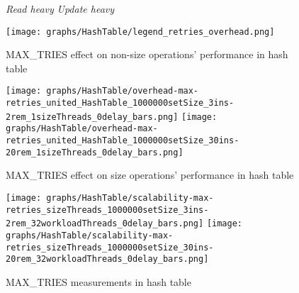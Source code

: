 \documentclass{article}
\begin{document}
\begin{figure*}[htbp]
	\centering
	\medskip
	\textit{Read heavy}\hspace{10cm}
	\textit{Update heavy}\par
	\medskip
	\texttt{[image: graphs/HashTable/legend\_retries\_overhead.png]}\par\vspace{0.5em}
    MAX\_TRIES effect on non-size operations' performance in hash table\par
        \medskip
	\texttt{[image: graphs/HashTable/overhead-max-retries\_united\_HashTable\_1000000setSize\_3ins-2rem\_1sizeThreads\_0delay\_bars.png]}\hspace{2.5em}
	\texttt{[image: graphs/HashTable/overhead-max-retries\_united\_HashTable\_1000000setSize\_30ins-20rem\_1sizeThreads\_0delay\_bars.png]}\vspace{-1.2em}

    	        \vspace{1.2em}
	MAX\_TRIES effect on size operations' performance in hash table\par
        \medskip
	\texttt{[image: graphs/HashTable/scalability-max-retries\_sizeThreads\_1000000setSize\_3ins-2rem\_32workloadThreads\_0delay\_bars.png]}\hspace{2.5em}
	\texttt{[image: graphs/HashTable/scalability-max-retries\_sizeThreads\_1000000setSize\_30ins-20rem\_32workloadThreads\_0delay\_bars.png]}\vspace{-1.2em}
	\caption{MAX\_TRIES measurements in hash table}
	\label{fig:MAX_TRIES HT}
\end{figure*}
\end{document}
